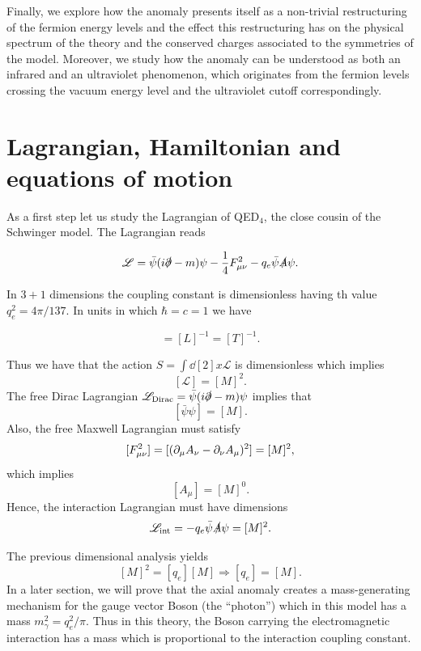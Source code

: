 Finally, we explore how the anomaly presents itself as a non-trivial restructuring of the fermion energy levels and the effect this restructuring has on the physical spectrum of the theory and the conserved charges associated to the symmetries of the model. Moreover, we study how the anomaly can be understood as both an infrared and an ultraviolet phenomenon, which originates from the fermion levels crossing the vacuum energy level and the ultraviolet cutoff correspondingly.




\section{Lagrangian, Hamiltonian and equations of motion}\label{sec:LagrangianHamiltonian}

As a first step let us study the Lagrangian of QED$_4$, the close cousin of the Schwinger model. The Lagrangian reads

\begin{equation}
\mathscr{L} =  \bar\psi (i\slashed{\partial} - m )\psi - \frac{1}{4} F_{\mu\nu}^2 - q_e \bar\psi\slashed{A}\psi.
\end{equation}

In $3+1$ dimensions the coupling constant is dimensionless having th value $q_e^2 = 4\pi/137$. In units in which $\hbar = c = 1$ we have

\begin{equation}
[M] = [L]^{-1}=[T]^{-1}.
\end{equation}

Thus we have that the action $S = \int\dd[2]{x} \mathscr{L}$ is dimensionless which implies $$[\mathscr L] = [M]^2.$$ The free Dirac Lagrangian $\mathscr{L}_{\text{Dirac}} = \bar\psi (i\slashed{\partial} - m )\psi$ implies that $$[\bar\psi\psi] = [M].$$ Also, the free Maxwell Lagrangian must satisfy $$[F_{\mu\nu}^2] = [(\partial_\mu A_\nu - \partial_\nu A_\mu)^2] = [M]^2,$$
which implies $$[A_\mu] = [M]^0.$$ Hence, the interaction Lagrangian must have dimensions $$\mathscr{L}_{\text{int}}=-q_e \bar\psi\slashed{A}\psi = [M]^2.$$

The previous dimensional analysis yields $$[M]^2 = [q_e][M] \Rightarrow [q_e]=[M].$$ In a later section, we will prove that the axial anomaly creates a mass-generating mechanism for the gauge vector Boson (the ``photon'') which in this model has a mass $m_\gamma^2 =q_e^2/\pi$. Thus in this theory, the Boson carrying the electromagnetic interaction has a mass which is proportional to the interaction coupling constant.\\

